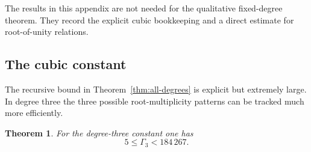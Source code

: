 \documentclass[a4paper]{amsart}
\newtheorem{theorem}{Theorem}[section]
\theoremstyle{remark}
\begin{document}
The results in this appendix are not needed for the qualitative fixed-degree
theorem.  They record the explicit cubic bookkeeping and a direct estimate for
root-of-unity relations.

\subsection{The cubic constant}

The recursive bound in Theorem~\ref{thm:all-degrees} is explicit but extremely large.  In degree three the three possible root-multiplicity patterns can be tracked much more efficiently.

\begin{theorem}\label{thm:degree-three}
For the degree-three constant one has
\[
       5\leqslant\Gamma_3<184\,267.
\]
\end{theorem}
\end{document}
